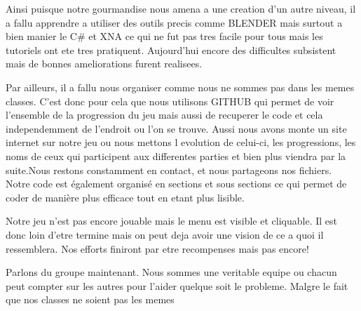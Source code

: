 \documentclass{article}
\begin{document}
\par
Ainsi puisque notre gourmandise nous amena a une creation d'un autre niveau, il a fallu apprendre a utiliser des outils precis comme BLENDER mais surtout a bien manier le C# et XNA ce qui ne fut pas tres facile pour tous mais les tutoriels ont ete tres pratiquent. Aujourd'hui encore des difficultes subsistent mais de bonnes ameliorations furent realisees.
\newline

\par
Par ailleurs, il a fallu nous organiser comme nous ne sommes pas dans les memes classes. C'est donc pour cela que nous utilisons GITHUB qui permet de voir l'ensemble de la progression du jeu mais aussi de recuperer le code et cela independemment de l'endroit ou l'on se trouve. Aussi nous avons monte un site internet sur notre jeu ou nous mettons l evolution de celui-ci, les progressions, les noms de ceux qui participent aux differentes parties et bien plus viendra par la suite.Nous restons constamment en contact, et nous partageons nos fichiers. Notre code est également organisé en sections et sous sections ce qui permet de coder de manière plus efficace tout en etant  plus lisible.
\newline

\par
Notre jeu n'est pas encore jouable mais le menu est visible et cliquable. Il est donc loin d'etre termine mais on peut deja avoir une vision de ce a quoi il ressemblera. Nos efforts finiront par etre recompenses mais pas encore!
\newline

\par
Parlons du groupe maintenant. Nous sommes une veritable equipe ou chacun peut compter sur les autres pour l'aider quelque soit le probleme. Malgre le fait que nos classes ne soient pas les memes 
\end{document}
